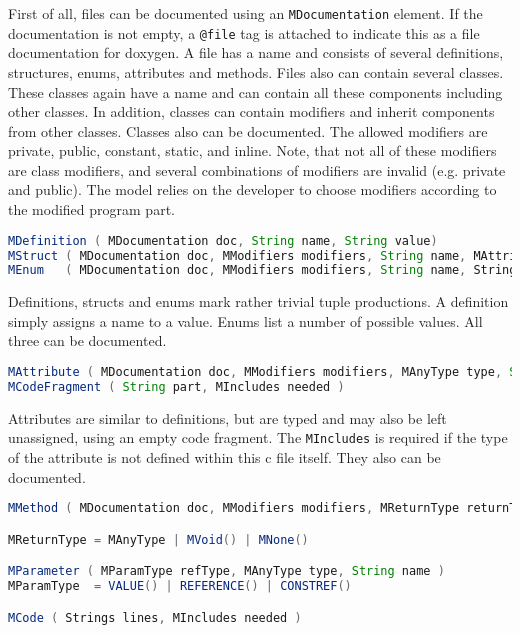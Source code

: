 \documentclass{report}
\begin{document}
First of all, files can be documented using an \texttt{MDocumentation} element. If the documentation is not empty, a \texttt{@file} tag is attached to indicate this as a file documentation for doxygen.  A file has a name and consists of several definitions, structures, enums, attributes and methods. Files also can contain several classes. These classes again have a name and can contain all these components including other classes. In addition, classes can contain modifiers and inherit components from other classes. Classes also can be documented.
The allowed modifiers are private, public, constant, static, and inline. Note, that not all of these modifiers are class modifiers, and several combinations of modifiers are invalid (e.g. private and public). The model relies on the developer to choose modifiers according to the modified program part.

\begin{lstlisting}[language=java, breaklines=true]
MDefinition ( MDocumentation doc, String name, String value)
MStruct ( MDocumentation doc, MModifiers modifiers, String name, MAttributes attributes )
MEnum   ( MDocumentation doc, MModifiers modifiers, String name, Strings values )
\end{lstlisting}

Definitions, structs and enums mark rather trivial tuple productions. A definition simply assigns a name to a value. %
Enums list a number of possible values. All three can be documented.

\begin{lstlisting}[language=java, breaklines=true]
MAttribute ( MDocumentation doc, MModifiers modifiers, MAnyType type, String name, MCodeFragment initial )
MCodeFragment ( String part, MIncludes needed )
\end{lstlisting}

Attributes are similar to definitions, but are typed and may also be left unassigned, using an empty code fragment. The \texttt{MIncludes} is required if the type of the attribute is not defined within this c file itself. They also can be documented.

\begin{lstlisting}[language=java, breaklines=true]
MMethod ( MDocumentation doc, MModifiers modifiers, MReturnType returnType, String name, MParameters parameter, MCode body )

MReturnType = MAnyType | MVoid() | MNone()

MParameter ( MParamType refType, MAnyType type, String name )
MParamType  = VALUE() | REFERENCE() | CONSTREF()

MCode ( Strings lines, MIncludes needed )
\end{lstlisting}
\end{document}
